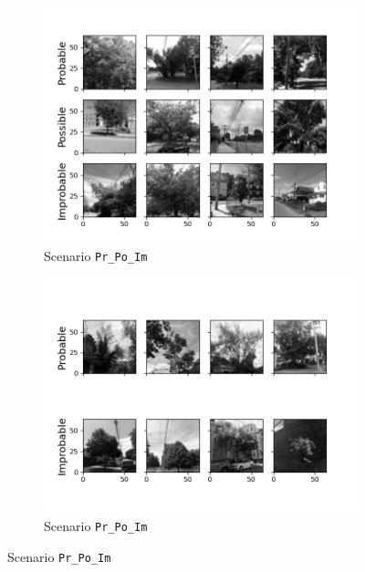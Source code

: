 \documentclass[Journal,letterpaper, SingleSpace, InsideFigs]{ascelike-new}
\begin{document}
\begin{figure}[h!]
  \centering
  \begin{subfigure}[t]{.5\linewidth}
    \centering
    \includegraphics[width=\linewidth]{processed_input_images_Pr_Po_Im_64_px}
    \caption{Scenario \texttt{Pr\_Po\_Im}}
    \label{pr_po_im_64}
  \end{subfigure}%
  \begin{subfigure}[t]{.5\linewidth}
    \centering
    \includegraphics[width=\linewidth]{processed_input_images_Pr_Im_64_px}
    \caption{Scenario \texttt{Pr\_Po\_Im}}
    \label{pr_im_64}
  \end{subfigure}%
  

\end{figure}
\end{document}
